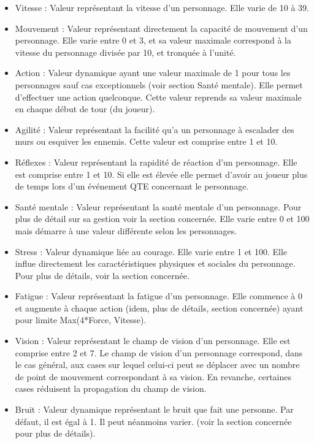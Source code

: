 \begin{itemize}
  \item Vitesse : Valeur représentant la vitesse d'un personnage. Elle varie de 10 à 39.
  \item Mouvement : Valeur représentant directement la capacité de mouvement d'un personnage. Elle varie entre 0 et 3, et sa valeur maximale correspond à la vitesse du personnage divisée par 10, et tronquée à l'unité.
  \item Action : Valeur dynamique ayant une valeur maximale de 1 pour tous les personnages sauf cas exceptionnels (voir section Santé mentale). Elle permet d'effectuer une action quelconque. Cette valeur reprends sa valeur maximale en chaque début de tour (du joueur).
  \item Agilité : Valeur représentant la facilité qu'a un personnage à escalader des murs ou esquiver les ennemis. Cette valeur est comprise entre 1 et 10.
  \item Réflexes : Valeur représentant la rapidité de réaction d'un personnage. Elle est comprise entre 1 et 10. Si elle est élevée elle permet d'avoir au joueur plus de temps lors d'un événement QTE concernant le personnage.
  \item Santé mentale : Valeur représentant la santé mentale d'un personnage. Pour plus de détail sur sa gestion voir la section concernée. Elle varie entre 0 et 100 mais démarre à une valeur différente selon les personnages.
  \item Stress : Valeur dynamique liée au courage. Elle varie entre 1 et 100. Elle influe directement les caractéristiques physiques et sociales du personnage. Pour plus de détails, voir la section concernée.
  \item Fatigue : Valeur représentant la fatigue d'un personnage. Elle commence à 0 et augmente à chaque action (idem, plus de détails, section concernée) ayant pour limite Max(4*Force, Vitesse).
  \item Vision : Valeur représentant le champ de vision d'un personnage. Elle est comprise entre 2 et 7. Le champ de vision d'un personnage correspond, dans le cas général, aux cases sur lequel celui-ci peut se déplacer avec un nombre de point de mouvement correspondant à sa vision. En revanche, certaines cases réduisent la propagation du champ de vision.
  \item Bruit : Valeur dynamique représentant le bruit que fait une personne. Par défaut, il est égal à 1. Il peut néanmoins varier. (voir la section concernée pour plus de détails).
\end{itemize}

